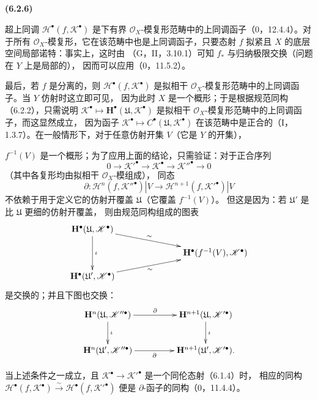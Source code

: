\documentclass[UTF8,fontset=none,11pt,oneside,openany]{ctexbook}
\newenvironment{env}[1][]{%
  \par\medskip\noindent\textbf{(#1)}\ %
}{\par}
\newcommand{\oldpage}[2][]{%
  \hypertarget{ega-source-page-#1-#2}{}%
  \marginnote{\scriptsize\textbf{#1}~|~#2}\ignorespaces}
\begin{document}
\begin{env}[6.2.6]
超上同调 $\mathscr H^\bullet(f,\mathscr K^\bullet)$ 是下有界
$\mathscr O_X$-模复形范畴中的上同调函子（0，12.4.4）。对于所有
$\mathscr O_X$-模复形，它在该范畴中也是上同调函子，只要态射
$f$ 拟紧且 $X$ 的底层空间局部诺特：事实上，这时由
（G，II，3.10.1）可知 $f_*$ 与归纳极限交换（问题在 $Y$ 上是局部的），
因而可以应用（0，11.5.2）。

最后，若 $f$ 是分离的，则
$\mathscr H^\bullet(f,\mathscr K^\bullet)$ 是拟相干
$\mathscr O_X$-模复形范畴中的上同调函子。当 $Y$ 仿射时这立即可见，
因为此时 $X$ 是一个概形；于是根据规范同构（6.2.2），只需说明
$\mathscr K^\bullet\mapsto\mathbf H^\bullet(\mathfrak U,\mathscr K^\bullet)$
是拟相干 $\mathscr O_X$-模复形范畴中的上同调函子，而这显然成立，
因为函子
$\mathscr K^\bullet\mapsto C^\bullet(\mathfrak U,\mathscr K^\bullet)$
在该范畴中是正合的（I，1.3.7）。在一般情形下，对于任意仿射开集 $V$（它是 $Y$ 的开集），

\oldpage[III]{141}

$f^{-1}(V)$ 是一个概形；为了应用上面的结论，只需验证：对于正合序列
\[
  0\longrightarrow\mathscr K'^\bullet
  \longrightarrow\mathscr K^\bullet
  \longrightarrow\mathscr K''^\bullet
  \longrightarrow0
\]
（其中各复形均由拟相干 $\mathscr O_X$-模组成），
同态
\[
  \partial:
  \mathscr H^n(f,\mathscr K''^\bullet)|V
  \longrightarrow
  \mathscr H^{n+1}(f,\mathscr K'^\bullet)|V
\]
不依赖于用于定义它的仿射开覆盖 $\mathfrak U$（它覆盖 $f^{-1}(V)$）。
但这是因为：若 $\mathfrak U'$ 是比 $\mathfrak U$ 更细的仿射开覆盖，
则由规范同构组成的图表
\[
  \xymatrix@C=34pt@R=11pt{
    \mathbf H^\bullet(\mathfrak U,\mathscr K^\bullet)
      \ar[rrd]^-{\sim}\ar[dd]^{\iota}
    && \\
    &&
    \mathbf H^\bullet(f^{-1}(V),\mathscr K^\bullet)
    \\
    \mathbf H^\bullet(\mathfrak U',\mathscr K^\bullet)
      \ar[rru]_-{\sim}
    &&
  }
\]
是交换的；并且下图也交换：
\[
  \xymatrix@C=46pt@R=25pt{
    \mathbf H^n(\mathfrak U,\mathscr K''^\bullet)
      \ar[r]^-{\partial}\ar[d]^{\iota}
    &
    \mathbf H^{n+1}(\mathfrak U,\mathscr K'^\bullet)
      \ar[d]^{\iota}
    \\
    \mathbf H^n(\mathfrak U',\mathscr K''^\bullet)
      \ar[r]_-{\partial}
    &
    \mathbf H^{n+1}(\mathfrak U',\mathscr K'^\bullet).
  }
\]

当上述条件之一成立，且
$\mathscr K^\bullet\to\mathscr K'^\bullet$ 是一个同伦态射（6.1.4）时，
相应的同构
$\mathscr H^\bullet(f,\mathscr K^\bullet)\xrightarrow{\sim}
\mathscr H^\bullet(f,\mathscr K'^\bullet)$
便是 $\partial$-函子的同构（0，11.4.4）。
\end{env}
\end{document}
